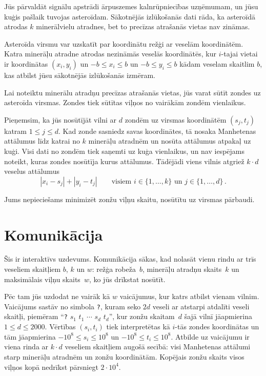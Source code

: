 

\noindent
Jūs pārvaldāt signālu apstrādi ārpuszemes kalnrūpniecības uzņēmumam, un jūsu kuģis pašlaik tuvojas asteroīdam. Sākotnējās izlūkošanās dati rāda, ka asteroīdā atrodas $k$ minerālvielu atradnes, bet to precīzas atrašanās vietas nav zināmas.

\medskip

Asteroīda virsmu var uzskatīt par koordinātu režģi ar veselām koordinātēm.
Katra minerāļu atradne atrodas nezināmās veselās koordinātēs, kur $i$-tajai vietai ir koordinātas $(x_i, y_i)$ un
$-b \le x_i \le b$ un $-b\le y_i \le b$ %
kādam veselam skaitlim $b$, kas atbilst jūsu sākotnējās  izlūkošanās izmēram.

Lai noteiktu minerālu atradņu precīzas atrašanās vietas, jūs varat sūtīt zondes uz asteroīda virsmas.
Zondes tiek sūtītas viļņos no vairākām zondēm vienlaikus.

Pieņemsim, ka jūs nosūtījāt vilni ar $d$ zondēm uz virsmas koordinātēm $(s_j, t_j)$ katram $1\leq j\leq d$.
Kad zonde sasniedz savas koordinātes, tā nosaka Manhetenas attālumus līdz katrai no $k$ minerāļu atradnēm un nosūta attālumus atpakaļ uz kuģi.
Visi dati no zondēm tiek saņemti uz kuģa vienlaikus, un nav iespējams noteikt, kuras zondes nosūtīja kurus attālumus.
Tādējādi viens vilnis atgriež $k\cdot d$ veselus attālumus
\[|x_i-s_j| + |y_i - t_j| \qquad\text{visiem } i \in \{1,\ldots,k\} \text{ un } j \in\{ 1,\ldots,d\}\,.\]

Jums nepieciešams minimizēt zonžu viļņu skaitu, nosūtītu uz virsmas pārbaudi.


\section*{Komunikācija}

Šis ir interaktīvs uzdevums.
Komunikācija sākas, kad nolasāt vienu rindu ar trīs veseliem skaitļiem $b$, $k$ un $w$:
režģa robeža~$b$,
minerāļu atradņu skaits~$k$
un maksimālais viļņu skaits~$w$, ko jūs drīkstat nosūtīt.

Pēc tam jūs uzdodat ne vairāk kā $w$ vaicājumus, kur katrs atbilst vienam vilnim.
Vaicājums sastāv no simbola \texttt{?}, kuram seko $2d$ veseli ar atstarpi atdalīti veseli skaitļi, piemēram ``\texttt{?} $s_1$ $t_1$ $\cdots$ $s_d$ $t_d$'', kur zonžu skaitam~$d$ šajā vilnī jāapmierina
$1\leq d\leq 2000$. %
Vērtības $(s_i, t_i)$ tiek interpretētas kā $i$-tās zondes koordinātas un tām jāapmierina
$-10^8 \leq s_i \leq 10^8$ un $-10^8 \leq t_i \leq 10^8$. %
Atbilde uz vaicājumu ir viena rinda ar $k \cdot d$ veseliem skaitļiem augošā secībā: visi Manhetenas attālumi starp minerāļu atradnēm un zonžu koordinātām.
Kopējais zonžu skaits visos viļņos kopā nedrīkst pārsniegt
$2\cdot 10^4$. %

